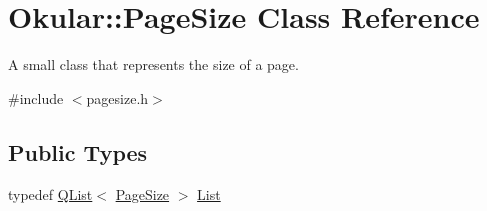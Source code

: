 \hypertarget{classOkular_1_1PageSize}{\section{Okular\+:\+:Page\+Size Class Reference}
\label{classOkular_1_1PageSize}
}


A small class that represents the size of a page.  




{\ttfamily \#include $<$pagesize.\+h$>$}

\subsection*{Public Types}
\begin{DoxyCompactItemize}
\item 
typedef \hyperlink{classQList}{Q\+List}$<$ \hyperlink{classOkular_1_1PageSize}{Page\+Size} $>$ \hyperlink{classOkular_1_1PageSize_a6c450ee7c579f47402a21588403ea0ab}{List}
\end{DoxyCompactItemize}
